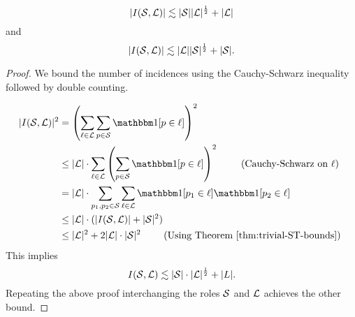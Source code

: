 \begin{lemma}
    $$|I(\mathcal S,\mathcal L)| \lesssim |\mathcal S| |\mathcal L|^{\frac{1}{2}} + |\mathcal L|$$
    and
    $$|I(\mathcal S,\mathcal L)| \lesssim |\mathcal L| |\mathcal S|^{\frac{1}{2}} + |\mathcal S|.$$
    \label{thm:pretty-trivial-ST-bounds}
\end{lemma}
\begin{proof}
We bound the number of incidences using the Cauchy-Schwarz inequality followed by double counting.

\begin{align*}
    |I(\ES,\LL)|^2 &= \left( \sum_{\ell \in \LL} \sum_{p \in \ES} \OO[p\in \ell] \right)^2 \\
    & \leq |\LL|\cdot \sum_{\ell \in \LL} \left( \sum_{p \in \ES} \OO[p\in \ell] \right)^2  \qquad \text{ (Cauchy-Schwarz on $\ell$)}\\
    &= |\LL|\cdot \sum_{p_1,p_2 \in \ES} \sum_{\ell \in \LL}   \OO[p_1\in \ell] \OO[p_2\in \ell]    \\
    & \leq |\LL|\cdot ( |I(\ES,\LL)| + |\ES|^2)\\ 
    &\leq |\LL|^2 + 2|\LL|\cdot |\ES|^2 \qquad \text{ (Using Theorem \ref{thm:trivial-ST-bounds}) }\\ 
\end{align*}    
This implies
$$I(\mathcal S,\mathcal L) \lesssim |\mathcal S|\cdot |\mathcal L|^{\frac{1}{2}} + |L|.$$ 
Repeating the above proof interchanging the roles $\mathcal S$ and $\mathcal L$ achieves the other bound.
\end{proof}


